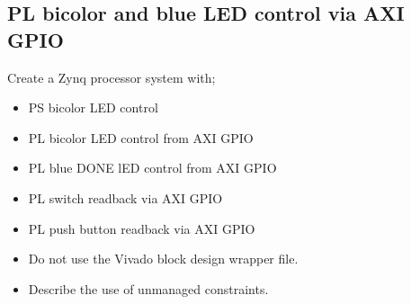 \subsection{PL bicolor and blue LED control via AXI GPIO}

Create a Zynq processor system with;
%
\begin{itemize}
\item PS bicolor LED control
\item PL bicolor LED control from AXI GPIO
\item PL blue DONE lED control from AXI GPIO
\item PL switch readback via AXI GPIO
\item PL push button readback via AXI GPIO
\item Do not use the Vivado block design wrapper file.
\item Describe the use of unmanaged constraints.
\end{itemize}
